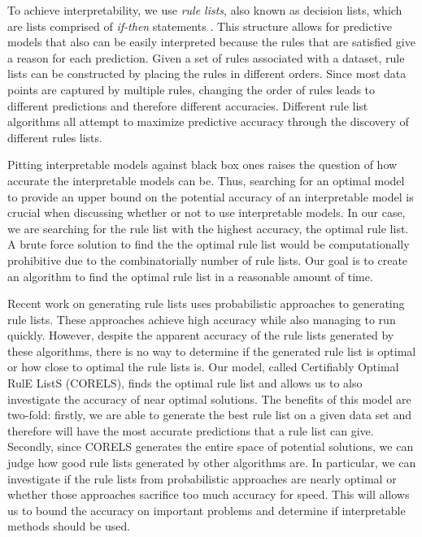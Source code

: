 \documentclass[]{article}
\theoremstyle{definition}
\begin{document}
To achieve interpretability, we use \emph{rule lists}, also known as decision lists, which are lists comprised of \emph{if-then} statements \cite{Rivest87}. 
This structure allows for predictive models that also can be easily interpreted because the rules that are satisfied give a reason for each prediction. 
Given a set of rules associated with a dataset, rule lists can be constructed by placing the rules in different orders.
Since most data points are captured by multiple rules, changing the order of rules leads to different predictions and therefore different accuracies. 
Different rule list algorithms all attempt to maximize predictive accuracy through the discovery of different rules lists.

Pitting interpretable models against black box ones raises the question of how accurate the interpretable models can be.
Thus, searching for an optimal model to provide an upper bound on the potential accuracy of an interpretable model is crucial when discussing whether or not to use interpretable models.
In our case, we are searching for the  rule list with the highest accuracy, the optimal rule list. 
A brute force solution to find the the optimal rule list would be computationally prohibitive due to the combinatorially number of rule lists.
Our goal is to create an algorithm to find the optimal rule list in a reasonable amount of time.

Recent work on generating rule lists \cite{LethamRuMcMa15,YangRuSe16} uses
probabilistic approaches to generating rule lists.
These approaches achieve high accuracy while also managing to run quickly. 
However, despite the apparent accuracy of the rule lists generated by these algorithms, there is no way to determine if the generated rule list is optimal or how close to optimal the rule lists is. 
Our model, called Certifiably Optimal RulE ListS (CORELS), finds the optimal rule list and allows us to also investigate the accuracy of near optimal solutions. 
The benefits of this model are two-fold: firstly, we are able to generate the best rule list on a given data set and therefore will have the most accurate predictions that a rule list can give.
Secondly, since CORELS generates the entire space of potential solutions, we can judge how good rule lists generated by other algorithms are. 
In particular, we can investigate if the rule lists from probabilistic approaches are nearly optimal or whether those approaches sacrifice too much accuracy for speed.
This will allows us to bound the accuracy on important problems and determine if interpretable methods should be used.
\end{document}
